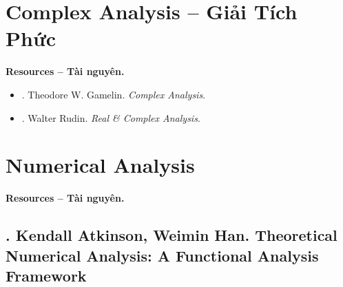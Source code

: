 \documentclass{article}
\begin{document}

\section{Complex Analysis -- Giải Tích Phức}
\textbf{\textsf{Resources -- Tài nguyên.}}
\begin{itemize}
	\item \cite{Gamelin2001}. {\sc Theodore W. Gamelin}. {\it Complex Analysis}.
	
	\item \cite{Rudin1987}. {\sc Walter Rudin}. {\it Real \& Complex Analysis}.
\end{itemize}


\section{Numerical Analysis}
\textbf{\textsf{Resources -- Tài nguyên.}}

\subsection{\cite{Atkinson_Han2009}. {\sc Kendall Atkinson, Weimin Han}. Theoretical Numerical Analysis: A Functional Analysis Framework}
\end{document}
